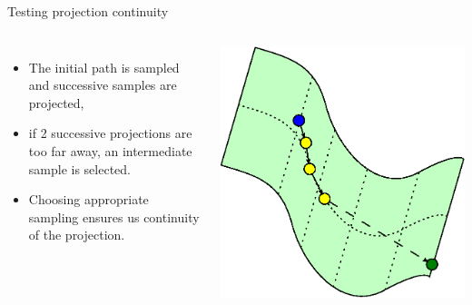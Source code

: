 \begin {frame} {Testing projection continuity}
  \begin{columns}
    \centering
    \begin {itemize}
      \item The initial path is sampled and successive samples are projected,
      \item {if 2 successive projections are too far away, an intermediate sample is selected.}
      \item {Choosing appropriate sampling ensures us continuity of the projection.}
    \end {itemize}
    \begin {center}
      \includegraphics [width=.9\linewidth] {figures/progressive_4.eps}
    \end {center}
  \end {columns}
\end {frame}

%
%

